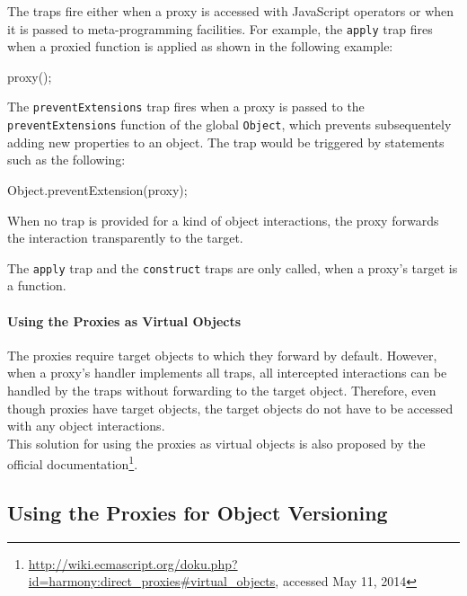 The traps fire either when a proxy is accessed with JavaScript operators or when it is passed to meta-programming facilities.
For example, the \lstinline{apply} trap fires when a proxied function is applied as shown in the following example:

\begin{code}{}{}
proxy();
\end{code}
\iffalse
\end{verbatim}\fi
The \lstinline{preventExtensions} trap fires when a proxy is passed to the \lstinline{preventExtensions} function of the global \lstinline{Object}, which prevents subsequentely adding new properties to an object.
The trap would be triggered by statements such as the following:

\begin{code}{}{}
Object.preventExtension(proxy);
\end{code}
\iffalse
\end{verbatim}\fi

When no trap is provided for a kind of object interactions, the proxy forwards the interaction transparently to the target.

The \lstinline{apply} trap and the \lstinline{construct} traps are only called, when a proxy's target is a function.

\paragraph{Using the Proxies as Virtual Objects}
The proxies require target objects to which they forward by default.
However, when a proxy's handler implements all traps, all intercepted interactions can be handled by the traps without forwarding to the target object.
Therefore, even though proxies have target objects, the target objects do not have to be accessed with any object interactions.
\\
This solution for using the proxies as virtual objects is also proposed by the official documentation\footnote{\url{http://wiki.ecmascript.org/doku.php?id=harmony:direct\_proxies\#virtual_objects}, accessed May 11, 2014}.



\subsection{Using the Proxies for Object Versioning} \label{subsec:IMPLEMENTATION:1.2}

